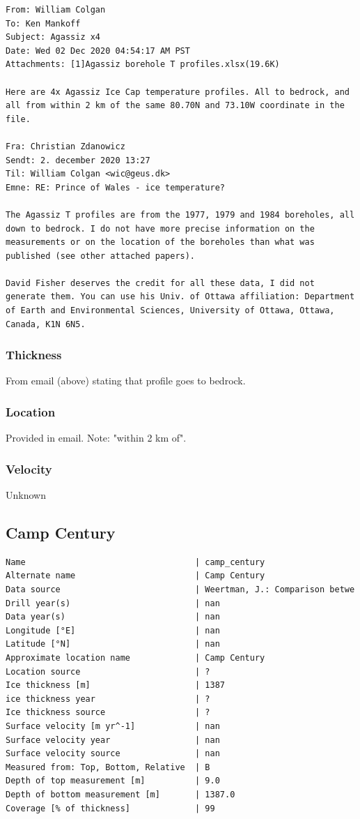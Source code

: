 \documentclass[article,a4paper,times,11pt,twoside]{article}
\begin{document}
\begin{verbatim}
From: William Colgan
To: Ken Mankoff
Subject: Agassiz x4
Date: Wed 02 Dec 2020 04:54:17 AM PST
Attachments: [1]Agassiz borehole T profiles.xlsx(19.6K)

Here are 4x Agassiz Ice Cap temperature profiles. All to bedrock, and
all from within 2 km of the same 80.70N and 73.10W coordinate in the
file.

Fra: Christian Zdanowicz
Sendt: 2. december 2020 13:27
Til: William Colgan <wic@geus.dk>
Emne: RE: Prince of Wales - ice temperature?

The Agassiz T profiles are from the 1977, 1979 and 1984 boreholes, all
down to bedrock. I do not have more precise information on the
measurements or on the location of the boreholes than what was
published (see other attached papers).

David Fisher deserves the credit for all these data, I did not
generate them. You can use his Univ. of Ottawa affiliation: Department
of Earth and Environmental Sciences, University of Ottawa, Ottawa,
Canada, K1N 6N5.
\end{verbatim}

\subsubsection{Thickness}
\label{sec:org565bb21}

From email (above) stating that profile goes to bedrock.

\subsubsection{Location}
\label{sec:org6c43a66}

Provided in email. Note: "within 2 km of".

\subsubsection{Velocity}
\label{sec:orgf25c9ab}

Unknown
\clearpage
\subsection{Camp Century}
\label{sec:org1f9f6ac}
\begin{verbatim}
Name                                  | camp_century
Alternate name                        | Camp Century
Data source                           | Weertman, J.: Comparison betwe
Drill year(s)                         | nan
Data year(s)                          | nan
Longitude [°E]                        | nan
Latitude [°N]                         | nan
Approximate location name             | Camp Century
Location source                       | ?
Ice thickness [m]                     | 1387
ice thickness year                    | ?
Ice thickness source                  | ?
Surface velocity [m yr^-1]            | nan
Surface velocity year                 | nan
Surface velocity source               | nan
Measured from: Top, Bottom, Relative  | B
Depth of top measurement [m]          | 9.0
Depth of bottom measurement [m]       | 1387.0
Coverage [% of thickness]             | 99
\end{verbatim}
\end{document}
